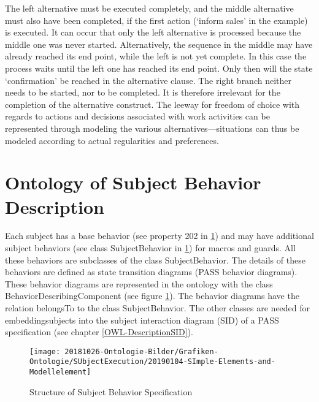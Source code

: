 The left alternative must be executed completely, and the middle alternative must also have been completed, if the first action (‘inform sales’ in the example) is executed. It can occur that only the left alternative is processed because the middle one was never started. Alternatively, the sequence in the middle may have already reached its end point, while the left is not yet complete. In this case the process waits until the left one has reached its end point. Only then will the state ‘confirmation’ be reached in the alternative clause. The right branch neither needs to be started, nor to be completed. It is therefore irrelevant for the completion of the alternative construct.
The leeway for freedom of choice with regards to actions and decisions associated with work activities can be represented through modeling the various alternatives—situations can thus be modeled according to actual regularities and preferences.


\newpage

\section{Ontology of Subject Behavior Description}
Each subject has a base behavior (see property 202 in \ref{fig:20190104-simple-elements-and-modellelement}) and may have additional subject behaviors (see class SubjectBehavior in \ref{fig:20190104-simple-elements-and-modellelement}) for macros and guards. All these behaviors are subclasses of the class SubjectBehavior. The details of these behaviors are defined as state transition diagrams (PASS behavior diagrams). These behavior diagrams are represented in the ontology with the class BehaviorDescribingComponent (see figure \ref{fig:20190104-simple-elements-and-modellelement}). The behavior diagrams have the relation belongsTo to the class SubjectBehavior. The other classes are needed for embeddingsubjects into the subject interaction diagram (SID) of a PASS specification (see chapter \ref{OWL-DescriptionSID}).
\begin{figure}[ph]
	\centering
	\texttt{[image: 20181026-Ontologie-Bilder/Grafiken-Ontologie/SUbjectExecution/20190104-SImple-Elements-and-Modellelement]}
	\caption[Structure of Subject Behavior Specification]{Structure of Subject Behavior Specification}
	\label{fig:20190104-simple-elements-and-modellelement}
\end{figure}

\newpage

